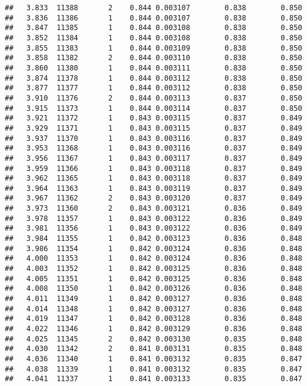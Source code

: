 \documentclass[
]{book}
\begin{document}
\begin{verbatim}
##   3.833  11388       2    0.844 0.003107        0.838        0.850
##   3.836  11386       1    0.844 0.003107        0.838        0.850
##   3.847  11385       1    0.844 0.003108        0.838        0.850
##   3.852  11384       1    0.844 0.003108        0.838        0.850
##   3.855  11383       1    0.844 0.003109        0.838        0.850
##   3.858  11382       2    0.844 0.003110        0.838        0.850
##   3.860  11380       1    0.844 0.003111        0.838        0.850
##   3.874  11378       1    0.844 0.003112        0.838        0.850
##   3.877  11377       1    0.844 0.003112        0.838        0.850
##   3.910  11376       2    0.844 0.003113        0.837        0.850
##   3.915  11373       1    0.844 0.003114        0.837        0.850
##   3.921  11372       1    0.843 0.003115        0.837        0.849
##   3.929  11371       1    0.843 0.003115        0.837        0.849
##   3.937  11370       1    0.843 0.003116        0.837        0.849
##   3.953  11368       1    0.843 0.003116        0.837        0.849
##   3.956  11367       1    0.843 0.003117        0.837        0.849
##   3.959  11366       1    0.843 0.003118        0.837        0.849
##   3.962  11365       1    0.843 0.003118        0.837        0.849
##   3.964  11363       1    0.843 0.003119        0.837        0.849
##   3.967  11362       2    0.843 0.003120        0.837        0.849
##   3.973  11360       2    0.843 0.003121        0.836        0.849
##   3.978  11357       1    0.843 0.003122        0.836        0.849
##   3.981  11356       1    0.843 0.003122        0.836        0.849
##   3.984  11355       1    0.842 0.003123        0.836        0.848
##   3.986  11354       1    0.842 0.003124        0.836        0.848
##   4.000  11353       1    0.842 0.003124        0.836        0.848
##   4.003  11352       1    0.842 0.003125        0.836        0.848
##   4.005  11351       1    0.842 0.003125        0.836        0.848
##   4.008  11350       1    0.842 0.003126        0.836        0.848
##   4.011  11349       1    0.842 0.003127        0.836        0.848
##   4.014  11348       1    0.842 0.003127        0.836        0.848
##   4.019  11347       1    0.842 0.003128        0.836        0.848
##   4.022  11346       1    0.842 0.003129        0.836        0.848
##   4.025  11345       2    0.842 0.003130        0.835        0.848
##   4.030  11342       2    0.841 0.003131        0.835        0.848
##   4.036  11340       1    0.841 0.003132        0.835        0.847
##   4.038  11339       1    0.841 0.003132        0.835        0.847
##   4.041  11337       1    0.841 0.003133        0.835        0.847

\end{verbatim}
\end{document}
